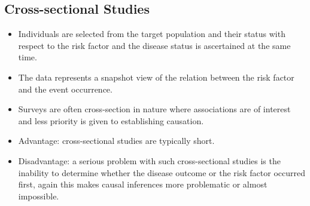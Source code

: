 \subsection{Cross-sectional Studies}
\begin{itemize}
      \item Individuals are selected from the target population and their
            status with respect to the risk factor and the disease status is
            ascertained at the same time.
      \item The data represents a snapshot view of the relation between
            the risk factor and the event occurrence.
      \item Surveys are often cross-section in nature where associations
            are of interest and less priority is given to establishing
            causation.
      \item Advantage: cross-sectional studies are typically short.
      \item Disadvantage: a serious problem with such cross-sectional
            studies is the inability to determine whether the disease
            outcome or the risk factor occurred first, again this makes
            causal inferences more problematic or almost impossible.
\end{itemize}
